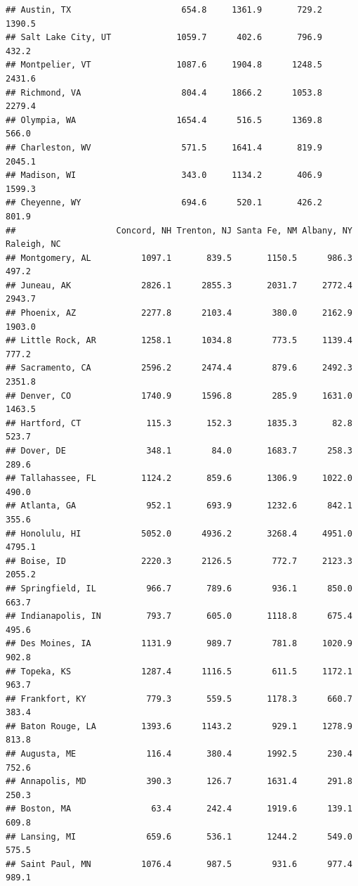 \documentclass[
]{article}
\begin{document}
\begin{verbatim}
## Austin, TX                      654.8     1361.9       729.2          1390.5
## Salt Lake City, UT             1059.7      402.6       796.9           432.2
## Montpelier, VT                 1087.6     1904.8      1248.5          2431.6
## Richmond, VA                    804.4     1866.2      1053.8          2279.4
## Olympia, WA                    1654.4      516.5      1369.8           566.0
## Charleston, WV                  571.5     1641.4       819.9          2045.1
## Madison, WI                     343.0     1134.2       406.9          1599.3
## Cheyenne, WY                    694.6      520.1       426.2           801.9
##                    Concord, NH Trenton, NJ Santa Fe, NM Albany, NY Raleigh, NC
## Montgomery, AL          1097.1       839.5       1150.5      986.3       497.2
## Juneau, AK              2826.1      2855.3       2031.7     2772.4      2943.7
## Phoenix, AZ             2277.8      2103.4        380.0     2162.9      1903.0
## Little Rock, AR         1258.1      1034.8        773.5     1139.4       777.2
## Sacramento, CA          2596.2      2474.4        879.6     2492.3      2351.8
## Denver, CO              1740.9      1596.8        285.9     1631.0      1463.5
## Hartford, CT             115.3       152.3       1835.3       82.8       523.7
## Dover, DE                348.1        84.0       1683.7      258.3       289.6
## Tallahassee, FL         1124.2       859.6       1306.9     1022.0       490.0
## Atlanta, GA              952.1       693.9       1232.6      842.1       355.6
## Honolulu, HI            5052.0      4936.2       3268.4     4951.0      4795.1
## Boise, ID               2220.3      2126.5        772.7     2123.3      2055.2
## Springfield, IL          966.7       789.6        936.1      850.0       663.7
## Indianapolis, IN         793.7       605.0       1118.8      675.4       495.6
## Des Moines, IA          1131.9       989.7        781.8     1020.9       902.8
## Topeka, KS              1287.4      1116.5        611.5     1172.1       963.7
## Frankfort, KY            779.3       559.5       1178.3      660.7       383.4
## Baton Rouge, LA         1393.6      1143.2        929.1     1278.9       813.8
## Augusta, ME              116.4       380.4       1992.5      230.4       752.6
## Annapolis, MD            390.3       126.7       1631.4      291.8       250.3
## Boston, MA                63.4       242.4       1919.6      139.1       609.8
## Lansing, MI              659.6       536.1       1244.2      549.0       575.5
## Saint Paul, MN          1076.4       987.5        931.6      977.4       989.1

\end{verbatim}
\end{document}

